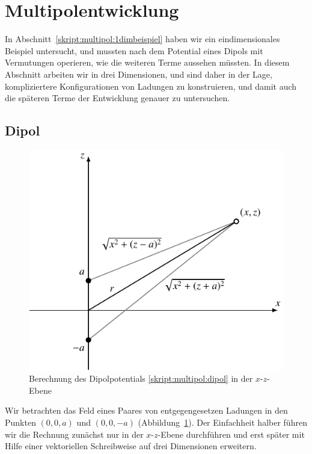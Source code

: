%
%
%
\section{Multipolentwicklung}
In Abschnitt~\ref{skript:multipol:1dimbeispiel} haben wir ein
eindimensionales Beispiel untersucht, und mussten nach dem Potential
eines Dipols mit Vermutungen operieren, wie die weiteren Terme aussehen
müssten.
In diesem Abschnitt arbeiten wir in drei Dimensionen, und sind daher
in der Lage, kompliziertere Konfigurationen von Ladungen zu
konstruieren, und damit auch die späteren Terme der Entwicklung
genauer zu untersuchen.


\subsection{Dipol}
\begin{figure}
\centering
\includegraphics{chapters/tikz/dipol2.pdf}
\caption{Berechnung des Dipolpotentials 
\eqref{skript:multipol:dipol} in der $x$-$z$-Ebene
\label{skript:multipol:figure:dipol}}
\end{figure}
Wir betrachten das Feld eines Paares von entgegengesetzen Ladungen
in den Punkten $(0,0,a)$ und $(0,0,-a)$
(Abbildung~\ref{skript:multipol:figure:dipol}).
Der Einfachheit halber führen wir die Rechnung zunächst nur
in der $x$-$z$-Ebene durchführen und erst später mit Hilfe einer
vektoriellen Schreibweise auf drei Dimensionen erweitern.

